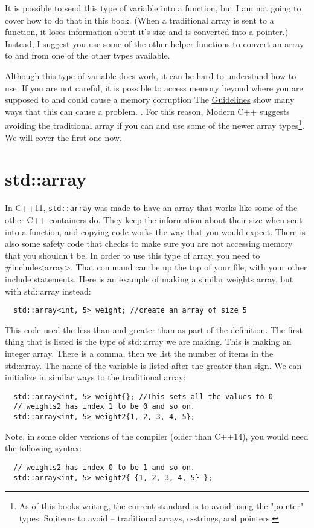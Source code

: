 It is possible to send this type of variable into a
function, but I am not going to cover how to do that
in this book. (When a traditional array is sent to a function, it loses information about it's size and is
converted into a pointer.) Instead, I suggest you use some of the
other helper functions to convert an array to and from
one of the other types available. 


Although this type of variable does work, it
can be hard to understand how to use. If you are not careful, 
it is possible to access memory beyond where you are supposed to and could cause a memory corruption
The \href{https://isocpp.github.io/CppCoreGuidelines/CppCoreGuidelines#p7-catch-run-time-errors-early}{Guidelines} show many ways that this can cause a problem. . For this reason, Modern C++ suggests avoiding the traditional array if you can and use some of the 
newer array types\footnote{As of this books writing, the current standard is to avoid using the "pointer" types. So,items to avoid -- traditional arrays, c-strings, and pointers.}. We will cover the first one now.

\section{std::array}
In C++11, {\tt std::array} was made to have an array that works like
some of the other C++ containers do. They keep the information about their size when sent into a function, and
copying code works the way that you would expect. There is
also some safety code that checks to make sure you are not 
accessing memory that you shouldn't be. In order to use this
type of array, you need to \#include<array>. That command can
be up the top of your file, with your other include statements. Here is an example of making a similar weights array, but with std::array instead:

\begin{lstlisting}
  std::array<int, 5> weight; //create an array of size 5
\end{lstlisting}
This code used the less than and greater than as part of
the definition. The first thing that is listed is the type 
of std::array we are making. This is making an integer array.
There is a comma, then we list the number of items in the 
std::array. The name of the variable is listed after the greater than sign. We can initialize in similar ways to
the traditional array:
\begin{lstlisting}
  std::array<int, 5> weight{}; //This sets all the values to 0
  // weights2 has index 1 to be 0 and so on.
  std::array<int, 5> weight2{1, 2, 3, 4, 5}; 
\end{lstlisting}
Note, in some older versions of the compiler (older than C++14), you would need the following syntax:
\begin{lstlisting}
  // weights2 has index 0 to be 1 and so on.
  std::array<int, 5> weight2{ {1, 2, 3, 4, 5} }; 
\end{lstlisting}

